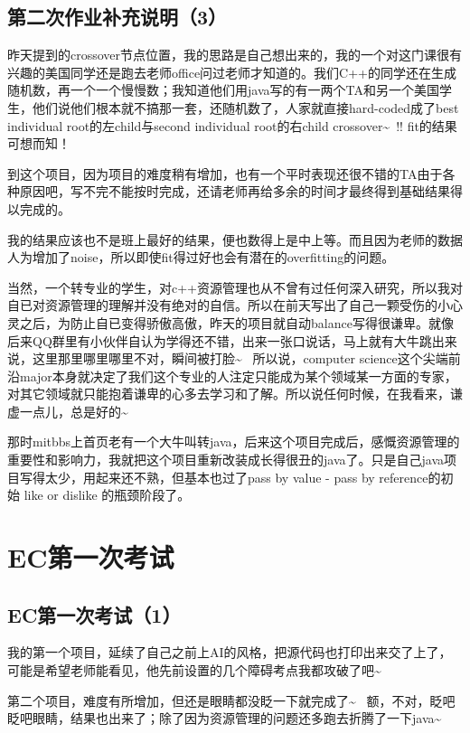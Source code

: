 \documentclass[12pt]{book}
\begin{document}
\section{第二次作业补充说明（3）}
\label{sec-27-5}

昨天提到的crossover节点位置，我的思路是自己想出来的，我的一个对这门课很有兴趣的美国同学还是跑去老师office问过老师才知道的。我们C++的同学还在生成随机数，再一个一个慢慢数；我知道他们用java写的有一两个TA和另一个美国学生，他们说他们根本就不搞那一套，还随机数了，人家就直接hard-coded成了best individual root的左child与second individual root的右child crossover\textasciitilde{}~!! fit的结果可想而知！

到这个项目，因为项目的难度稍有增加，也有一个平时表现还很不错的TA由于各种原因吧，写不完不能按时完成，还请老师再给多余的时间才最终得到基础结果得以完成的。

我的结果应该也不是班上最好的结果，便也数得上是中上等。而且因为老师的数据人为增加了noise，所以即使fit得过好也会有潜在的overfitting的问题。

当然，一个转专业的学生，对c++资源管理也从不曾有过任何深入研究，所以我对自已对资源管理的理解并没有绝对的自信。所以在前天写出了自己一颗受伤的小心灵之后，为防止自已变得骄傲高傲，昨天的项目就自动balance写得很谦卑。就像后来QQ群里有小伙伴自认为学得还不错，出来一张口说话，马上就有大牛跳出来说，这里那里哪里哪里不对，瞬间被打脸\textasciitilde{}~ 所以说，computer science这个尖端前沿major本身就决定了我们这个专业的人注定只能成为某个领域某一方面的专家，对其它领域就只能抱着谦卑的心多去学习和了解。所以说任何时候，在我看来，谦虚一点儿，总是好的\textasciitilde{}~ 

那时mitbbs上首页老有一个大牛叫转java，后来这个项目完成后，感慨资源管理的重要性和影响力，我就把这个项目重新改装成长得很丑的java了。只是自己java项目写得太少，用起来还不熟，但基本也过了pass by value - pass by reference的初始 like or dislike 的瓶颈阶段了。

\chapter{EC第一次考试}
\label{sec-28}
\section{EC第一次考试（1）}
\label{sec-28-1}

我的第一个项目，延续了自己之前上AI的风格，把源代码也打印出来交了上了，可能是希望老师能看见，他先前设置的几个障碍考点我都攻破了吧\textasciitilde{}~

第二个项目，难度有所增加，但还是眼睛都没眨一下就完成了\textasciitilde{}~ 额，不对，眨吧眨吧眼睛，结果也出来了；除了因为资源管理的问题还多跑去折腾了一下java\textasciitilde{}~
\end{document}

